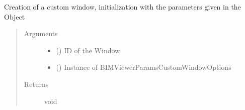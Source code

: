 \documentclass[a4paper,12pt,english]{sphinxmanual}
\begin{document}
\begin{fulllineitems}
\label{\detokenize{viewer/parameters:BIMDataViewer.addCustomWindow}}
Creation of a custom window, initialization with the parameters given in the  Object
\begin{quote}\begin{description}
\item[{Arguments}] \leavevmode\begin{itemize}
\item {} 
 () \textendash{} ID of the Window

\item {} 
 () \textendash{} Instance of BIMViewerParamsCustomWindowOptions

\end{itemize}

\item[{Returns}] \leavevmode
void

\end{description}\end{quote}

%
\begin{sphinxVerbatim}[commandchars=\\\{\}]
 
     
     
\end{sphinxVerbatim}

\end{fulllineitems}
\end{document}
